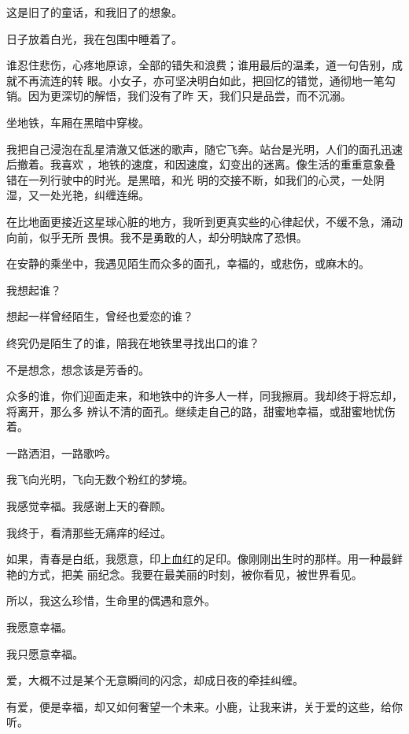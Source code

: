 \documentclass[12pt,a4paper]{article}
\begin{document}
		这是旧了的童话，和我旧了的想象。

		日子放着白光，我在包围中睡着了。

	\endwriting



		谁忍住悲伤，心疼地原谅，全部的错失和浪费；谁用最后的温柔，道一句告别，成就不再流连的转
	眼。小女子，亦可坚决明白如此，把回忆的错觉，通彻地一笔勾销。因为更深切的解悟，我们没有了昨
	天，我们只是品尝，而不沉溺。

		坐地铁，车厢在黑暗中穿梭。

		我把自己浸泡在乱星清澈又低迷的歌声，随它飞奔。站台是光明，人们的面孔迅速后撤着。我喜欢
	，地铁的速度，和因速度，幻变出的迷离。像生活的重重意象叠错在一列行驶中的时光。是黑暗，和光
	明的交接不断，如我们的心灵，一处阴湿，又一处光艳，纠缠连绵。

		在比地面更接近这星球心脏的地方，我听到更真实些的心律起伏，不缓不急，涌动向前，似乎无所
	畏惧。我不是勇敢的人，却分明缺席了恐惧。

		在安静的乘坐中，我遇见陌生而众多的面孔，幸福的，或悲伤，或麻木的。

		我想起谁？\par
		想起一样曾经陌生，曾经也爱恋的谁？\par
		终究仍是陌生了的谁，陪我在地铁里寻找出口的谁？\par
		不是想念，想念该是芳香的。

		众多的谁，你们迎面走来，和地铁中的许多人一样，同我擦肩。我却终于将忘却，将离开，那么多
	辨认不清的面孔。继续走自己的路，甜蜜地幸福，或甜蜜地忧伤着。

		一路洒泪，一路歌吟。\par
		我飞向光明，飞向无数个粉红的梦境。\par
		我感觉幸福。我感谢上天的眷顾。\par
		我终于，看清那些无痛痒的经过。

		如果，青春是白纸，我愿意，印上血红的足印。像刚刚出生时的那样。用一种最鲜艳的方式，把美
	丽纪念。我要在最美丽的时刻，被你看见，被世界看见。

		所以，我这么珍惜，生命里的偶遇和意外。

		我愿意幸福。

		我只愿意幸福。

	\endwriting



		爱，大概不过是某个无意瞬间的闪念，却成日夜的牵挂纠缠。

		有爱，便是幸福，却又如何奢望一个未来。小鹿，让我来讲，关于爱的这些，给你听。
\end{document}
